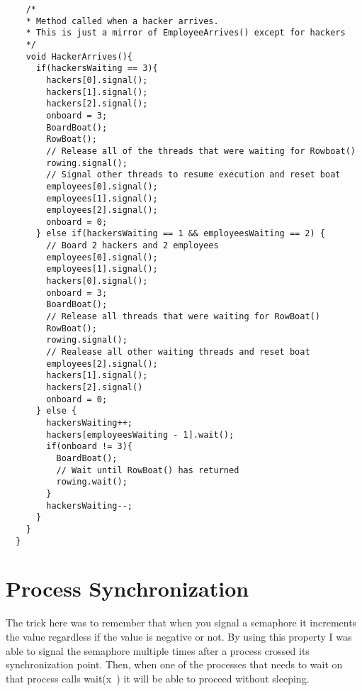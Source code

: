 \documentclass{article}
\begin{document}
\begin{lstlisting}
    /*
    * Method called when a hacker arrives.
    * This is just a mirror of EmployeeArrives() except for hackers
    */
    void HackerArrives(){
      if(hackersWaiting == 3){
        hackers[0].signal();
        hackers[1].signal();
        hackers[2].signal();
        onboard = 3;
        BoardBoat();
        RowBoat();
        // Release all of the threads that were waiting for Rowboat()
        rowing.signal();
        // Signal other threads to resume execution and reset boat
        employees[0].signal();
        employees[1].signal();
        employees[2].signal();
        onboard = 0;
      } else if(hackersWaiting == 1 && employeesWaiting == 2) {
        // Board 2 hackers and 2 employees
        employees[0].signal();
        employees[1].signal();
        hackers[0].signal();
        onboard = 3;
        BoardBoat();
        // Release all threads that were waiting for RowBoat()
        RowBoat();
        rowing.signal();
        // Realease all other waiting threads and reset boat
        employees[2].signal();
        hackers[1].signal();
        hackers[2].signal()
        onboard = 0;
      } else {
        hackersWaiting++;
        hackers[employeesWaiting - 1].wait();
        if(onboard != 3){
          BoardBoat();
          // Wait until RowBoat() has returned
          rowing.wait();
        }
        hackersWaiting--;
      }
    }
  }
\end{lstlisting}

\section{Process Synchronization}

The trick here was to remember that when you signal a semaphore it increments the value regardless if the value is negative or not. By using this property I was able to signal the semaphore multiple times after a process crossed its synchronization point. Then, when one of the processes that needs to wait on that process calls wait(x~) it will be able to proceed without sleeping.
\end{document}
